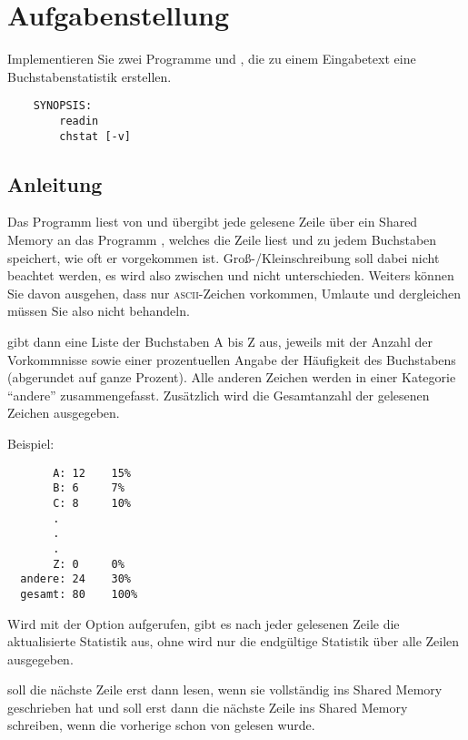




\section*{Aufgabenstellung}

Implementieren Sie zwei Programme  und , die
zu einem Eingabetext eine Buchstabenstatistik erstellen.

\begin{verbatim}
    SYNOPSIS:
        readin
        chstat [-v]
\end{verbatim}

\subsection*{Anleitung}

Das Programm  liest von  und übergibt jede
gelesene Zeile über ein Shared Memory an das Programm , welches
die Zeile liest und zu jedem Buchstaben speichert, wie oft er vorgekommen ist.
Groß-/Kleinschreibung soll dabei nicht beachtet werden, es wird also zwischen
 und  nicht unterschieden. Weiters können Sie davon
ausgehen, dass nur \textsc{ascii}-Zeichen vorkommen, Umlaute und dergleichen
müssen Sie also nicht behandeln.

 gibt dann eine Liste der Buchstaben A bis Z aus, jeweils mit
der Anzahl der Vorkommnisse sowie einer prozentuellen Angabe der Häufigkeit des
Buchstabens (abgerundet auf ganze Prozent). Alle anderen Zeichen werden in einer
Kategorie "`andere"' zusammengefasst. Zusätzlich wird die Gesamtanzahl der
gelesenen Zeichen ausgegeben.

Beispiel:
\begin{verbatim}
       A: 12    15%
       B: 6     7%
       C: 8     10%
       .
       .
       .
       Z: 0     0%
  andere: 24    30%
  gesamt: 80    100%
\end{verbatim}

Wird  mit der Option  aufgerufen, gibt es nach
jeder gelesenen Zeile die aktualisierte Statistik aus, ohne  wird
nur die endgültige Statistik über alle Zeilen ausgegeben.

 soll die nächste Zeile erst dann lesen, wenn 
sie vollständig ins Shared Memory geschrieben hat und  soll
erst dann die nächste Zeile ins Shared Memory schreiben, wenn die vorherige
schon von  gelesen wurde.

